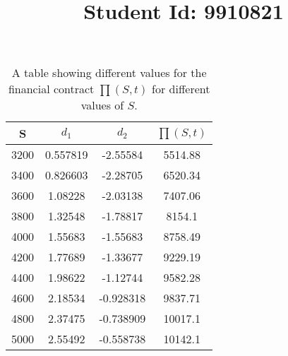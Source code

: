\documentclass{article}
\begin{document}
\title{Student Id: 9910821}
\date{}

\maketitle

\begin{table}[h!]
\centering
\begin{tabular}{c|c c c }
 S & $ d_1 $ & $ d_2 $ & $\prod(S,t)$\\
 \hline
3200 & 0.557819 & -2.55584 &  5514.88\\
3400 & 0.826603 & -2.28705 &  6520.34\\
3600 & 1.08228 & -2.03138 &  7407.06\\
3800 & 1.32548 & -1.78817 &  8154.1\\
4000 & 1.55683 & -1.55683 &  8758.49\\
4200 & 1.77689 & -1.33677 &  9229.19\\
4400 & 1.98622 & -1.12744 &  9582.28\\
4600 & 2.18534 & -0.928318 &  9837.71\\
4800 & 2.37475 & -0.738909 &  10017.1\\
5000 & 2.55492 & -0.558738 &  10142.1\\
\end{tabular}
\caption{A table showing different values for the financial contract $\prod(S,t)$ for different values of $S$.}
\label{table:1}
\end{table}

\lstset{style=mystyle}

\end{document}

